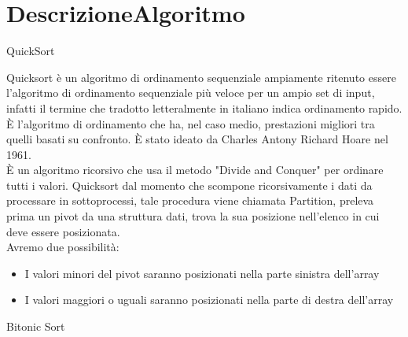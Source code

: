 \chapter{DescrizioneAlgoritmo}


\maketitle QuickSort

Quicksort è un algoritmo di ordinamento sequenziale ampiamente ritenuto essere l'algoritmo di ordinamento sequenziale più veloce per un ampio set di input, infatti il termine che tradotto letteralmente in italiano indica ordinamento rapido. È l'algoritmo di ordinamento che ha, nel caso medio, prestazioni migliori tra quelli basati su confronto. È stato ideato da Charles Antony Richard Hoare nel 1961.\\ 
È un algoritmo ricorsivo che usa il metodo "Divide and Conquer" per ordinare tutti i valori. Quicksort dal momento che scompone ricorsivamente i dati da processare in sottoprocessi, tale procedura viene chiamata Partition, preleva prima un pivot da una struttura dati, trova la sua posizione nell'elenco in cui deve essere posizionata. \\
Avremo due possibilità:
\begin{itemize}
\item I valori minori del pivot saranno posizionati nella parte sinistra dell'array
\item I valori maggiori o uguali saranno posizionati nella parte di destra dell'array
\end{itemize}




\maketitle Bitonic Sort



